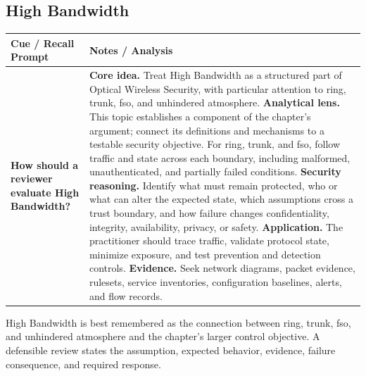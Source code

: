 \documentclass[11pt]{article}
\newcommand{\CornellHeader}{%
\rowcolor{Navy}\color{white}\bfseries Cue / Recall Prompt & \color{white}\bfseries Notes / Analysis\\\hline}
\newcommand{\CornellRow}[2]{%
\cellcolor{CueGray}\RaggedRight\textbf{#1} & \RaggedRight #2\\\hline}
\begin{document}
\subsection*{High Bandwidth}
\begin{longtable}{>{\RaggedRight\arraybackslash}p{}|>{\RaggedRight\arraybackslash}p{}}
\CornellHeader
\CornellRow{How should a reviewer evaluate High Bandwidth?}{\textbf{Core idea.} Treat High Bandwidth as a structured part of Optical Wireless Security, with particular attention to ring, trunk, fso, and unhindered atmosphere. \textbf{Analytical lens.} This topic establishes a component of the chapter's argument; connect its definitions and mechanisms to a testable security objective. For ring, trunk, and fso, follow traffic and state across each boundary, including malformed, unauthenticated, and partially failed conditions. \textbf{Security reasoning.} Identify what must remain protected, who or what can alter the expected state, which assumptions cross a trust boundary, and how failure changes confidentiality, integrity, availability, privacy, or safety. \textbf{Application.} The practitioner should trace traffic, validate protocol state, minimize exposure, and test prevention and detection controls. \textbf{Evidence.} Seek network diagrams, packet evidence, rulesets, service inventories, configuration baselines, alerts, and flow records.}
\end{longtable}
\begin{topicsummary}
High Bandwidth is best remembered as the connection between ring, trunk, fso, and unhindered atmosphere and the chapter's larger control objective. A defensible review states the assumption, expected behavior, evidence, failure consequence, and required response.
\end{topicsummary}
\end{document}
